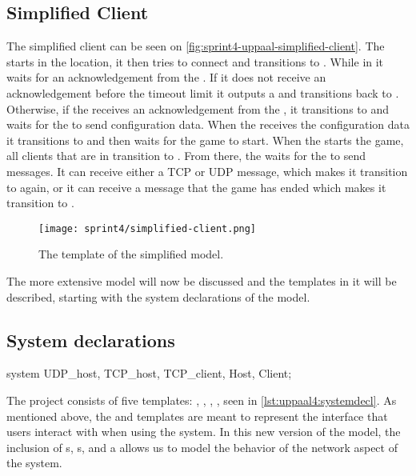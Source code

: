 \subsection*{Simplified Client}
The simplified client can be seen on  \autoref{fig:sprint4-uppaal-simplified-client}.
The  starts in the  location, it then tries to connect and transitions to .
While in  it waits for an acknowledgement from the .
If it does not receive an acknowledgement before the timeout limit it outputs a  and transitions back to .
Otherwise, if the  receives an acknowledgement from the , it transitions to  and waits for the  to send configuration data.
When the  receives the configuration data it transitions to  and then waits for the game to start.
When the  starts the game, all clients that are in  transition to .
From there, the  waits for the  to send messages.
It can receive either a TCP or UDP message, which makes it transition to  again, or it can receive a message that the game has ended which makes it transition to .
\begin{figure}[h]
    \centering
    \texttt{[image: sprint4/simplified-client.png]}
    \caption{The  template of the simplified \uppaal model.}
    \label{fig:sprint4-uppaal-simplified-client}
\end{figure}

\noindent
The more extensive \uppaal model will now be discussed and the templates in it will be described, starting with the system declarations of the model.

\subsection{System declarations}
\begin{uppaalcode}[caption={System declarations}, label={lst:uppaal4:systemdecl},captionpos=b]
    system UDP_host, TCP_host, TCP_client, Host, Client;
\end{uppaalcode}
The project consists of five templates: , , , ,  seen in \autoref{lst:uppaal4:systemdecl}.
As mentioned above, the  and  templates are meant to represent the interface that users interact with when using the system.
In this new version of the model, the inclusion of s, s, and a  allows us to model the behavior of the network aspect of the system.

